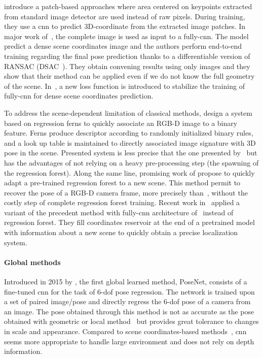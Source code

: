 \citet{Duong2018} introduce a patch-based approaches where area centered on keypoints extracted from standard image detector are used instead of raw pixels. During training, they use a \ac{cnn} to predict 3D-coordinate from the extracted image patches. In major work of~\citet{Brachmann2017b}, the complete image is used as input to a fully-\ac{cnn}. The model predict a dense scene coordinates image and the authors perform end-to-end training regarding the final pose prediction thanks to a differentiable version of RANSAC (DSAC~\citep{Brachmann2017}). They obtain convening results using only images and they show that their method can be applied even if we do not know the full geometry of the scene. In~\citep{Li2018}, a new loss function is introduced to stabilize the training of fully-\ac{cnn} for dense scene coordinates prediction.

To address the scene-dependent limitation of classical methods, \citet{Glocker2015} design a system based on regression ferns to quickly associate an RGB-D image to a binary feature. Ferns produce descriptor according to randomly initialized binary rules, and a look up table is maintained to directly associated image signature with 3D pose in the scene. Presented system is less precise that the one presented by~\citet{Shotton2013} but has the advantages of not relying on a heavy pre-processing step (\ie the spawning of the regression forest). Along the same line, promising work of \citet{Cavallari, Cavallari2018} propose to quickly adapt a pre-trained regression forest to a new scene. This method permit to recover the pose of a RGB-D camera frame, more precisely than~\citet{Glocker2013,Glocker2015}, without the costly step of complete regression forest training. Recent work in~\citep{Cavallari2019} applied a variant of the precedent method with fully-\ac{cnn} architecture of~\citep{Brachmann2017b} instead of regression forest. They fill coordinates reservoir at the end of a pretrained model with information about a new scene to quickly obtain a precise localization system.

\paragraph{Global methods}
\label{para:cnn_regressor}
Introduced in 2015 by \citet{Kendall2015}, the first global learned method, PoseNet, consists of a fine-tuned \ac{cnn} for the task of 6-\ac{dof} pose regression. The network is trained upon a set of paired image/pose and directly regress the 6-\ac{dof} pose of a camera from an image. The pose obtained through this method is not as accurate as the pose obtained with geometric or local method~\citep{Feng2016a,Brachmann2017b} but provides great tolerance to changes in scale and appearance. Compared to scene coordinates-based methods~\citep{Shotton2013,Li2018}, \ac{cnn} seems more appropriate to handle large environment and does not rely on depth information.

